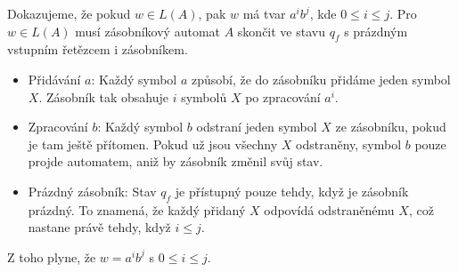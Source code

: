 Dokazujeme, že pokud $w \in L(A)$, pak $w$ má tvar $a^i b^j$, kde $0 \leq i \leq j$. Pro $w \in L(A)$ musí zásobníkový 
automat $A$ skončit ve stavu $q_f$ s prázdným vstupním řetězcem i zásobníkem.
\begin{itemize}[leftmargin=*]
    \item Přidávání $a$:
    Každý symbol $a$ způsobí, že do zásobníku přidáme jeden symbol $X$. Zásobník tak obsahuje $i$ symbolů $X$ po 
    zpracování $a^i$.
    \item Zpracování $b$:
    Každý symbol $b$ odstraní jeden symbol $X$ ze zásobníku, pokud je tam ještě přítomen. Pokud už jsou všechny $X$ 
    odstraněny, symbol $b$ pouze projde automatem, aniž by zásobník změnil svůj stav.
    \item Prázdný zásobník:
    Stav $q_f$ je přístupný pouze tehdy, když je zásobník prázdný. To znamená, že každý přidaný $X$ odpovídá 
    odstraněnému $X$, což nastane právě tehdy, když $i \leq j$.
\end{itemize}
Z toho plyne, že $w = a^i b^j$ s $0 \leq i \leq j$.
